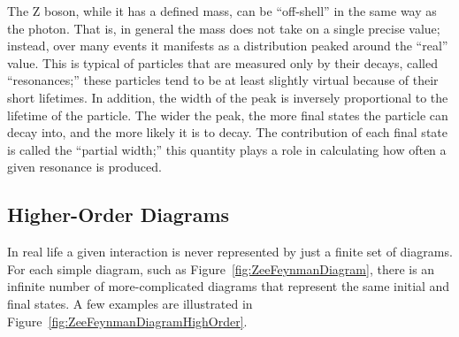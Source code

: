 The Z boson, while it has a defined mass, 
can be ``off-shell'' in the same way as the photon.  
That is, in general the 
mass 
does not take on a single precise value; 
instead, over many events it manifests as a distribution 
peaked around the ``real'' value.  
This is typical of particles that are measured only 
by their decays, called ``resonances;'' 
these particles tend to be at least slightly virtual 
because of their short lifetimes.  
In addition, the width of the peak is inversely proportional to the 
lifetime of the particle.  
The wider the peak, the more final states the particle can decay into, 
and the more likely it is to decay.  
The contribution of each final state is called the 
``partial width;'' 
this quantity plays a role in calculating 
how often a given resonance is produced.  




\subsection{Higher-Order Diagrams}



In real life a given interaction is 
never represented by just a finite set of diagrams.  
For each simple diagram, 
such as Figure~\ref{fig:ZeeFeynmanDiagram}, 
there is an infinite number of 
more-complicated diagrams that 
represent the same initial and final states.  
A few examples are illustrated in 
Figure~\ref{fig:ZeeFeynmanDiagramHighOrder}.  

